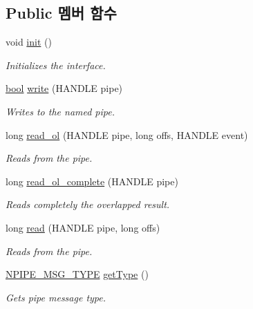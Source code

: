 \subsection*{Public 멤버 함수}
\begin{DoxyCompactItemize}
\item 
void \hyperlink{class_win_n_pipe_query_message_a02fd73d861ef2e4aabb38c0c9ff82947}{init} ()
\begin{DoxyCompactList}\small\item\em Initializes the interface. \end{DoxyCompactList}\item 
\hyperlink{avb__gptp_8h_af6a258d8f3ee5206d682d799316314b1}{bool} \hyperlink{class_windows_n_pipe_message_a1a6e0ed523a40350e1e0c44510d9caab}{write} (H\+A\+N\+D\+LE pipe)
\begin{DoxyCompactList}\small\item\em Writes to the named pipe. \end{DoxyCompactList}\item 
long \hyperlink{class_windows_n_pipe_message_a25ac1b47d55092db7e7204a83f6d3367}{read\+\_\+ol} (H\+A\+N\+D\+LE pipe, long offs, H\+A\+N\+D\+LE event)
\begin{DoxyCompactList}\small\item\em Reads from the pipe. \end{DoxyCompactList}\item 
long \hyperlink{class_windows_n_pipe_message_ad65e923c3adebfc9ff97d89007bf5633}{read\+\_\+ol\+\_\+complete} (H\+A\+N\+D\+LE pipe)
\begin{DoxyCompactList}\small\item\em Reads completely the overlapped result. \end{DoxyCompactList}\item 
long \hyperlink{class_windows_n_pipe_message_aefaf53a62a09b658795b4bff415c8c68}{read} (H\+A\+N\+D\+LE pipe, long offs)
\begin{DoxyCompactList}\small\item\em Reads from the pipe. \end{DoxyCompactList}\item 
\hyperlink{windows__ipc_8hpp_a5a7d5ebd4af251aa73a4afcce1dc68a1}{N\+P\+I\+P\+E\+\_\+\+M\+S\+G\+\_\+\+T\+Y\+PE} \hyperlink{class_windows_n_pipe_message_a7bafd143bb174fae7ef70730c8469f1c}{get\+Type} ()
\begin{DoxyCompactList}\small\item\em Gets pipe message type. \end{DoxyCompactList}\end{DoxyCompactItemize}
